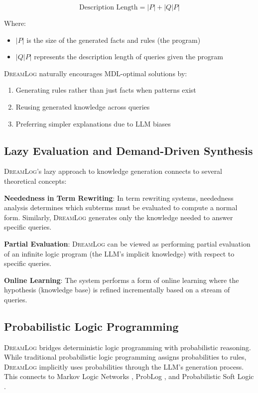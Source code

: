 \documentclass[11pt,a4paper]{article}
\newcommand{\dreamlog}{\textsc{DreamLog}}
\begin{document}
\begin{equation}
\text{Description Length} = |P| + |Q|P|
\end{equation}

Where:
\begin{itemize}
\item $|P|$ is the size of the generated facts and rules (the program)
\item $|Q|P|$ represents the description length of queries given the program
\end{itemize}

\dreamlog{} naturally encourages MDL-optimal solutions by:
\begin{enumerate}
\item Generating rules rather than just facts when patterns exist
\item Reusing generated knowledge across queries
\item Preferring simpler explanations due to LLM biases
\end{enumerate}

\subsection{Lazy Evaluation and Demand-Driven Synthesis}

\dreamlog{}'s lazy approach to knowledge generation connects to several theoretical concepts:

\textbf{Neededness in Term Rewriting}: In term rewriting systems, neededness analysis determines which subterms must be evaluated to compute a normal form. Similarly, \dreamlog{} generates only the knowledge needed to answer specific queries.

\textbf{Partial Evaluation}: \dreamlog{} can be viewed as performing partial evaluation of an infinite logic program (the LLM's implicit knowledge) with respect to specific queries.

\textbf{Online Learning}: The system performs a form of online learning where the hypothesis (knowledge base) is refined incrementally based on a stream of queries.

\subsection{Probabilistic Logic Programming}

\dreamlog{} bridges deterministic logic programming with probabilistic reasoning. While traditional probabilistic logic programming \citep{de2007problog} assigns probabilities to rules, \dreamlog{} implicitly uses probabilities through the LLM's generation process. This connects to Markov Logic Networks \citep{richardson2006markov}, ProbLog \citep{de2007problog}, and Probabilistic Soft Logic \citep{bach2017hinge}.
\end{document}
